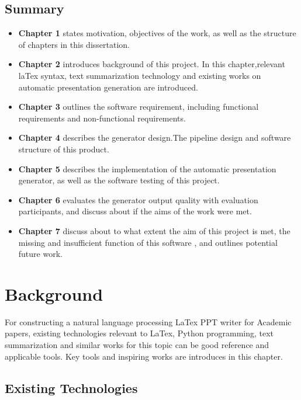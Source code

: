 \documentclass{l4proj}
\begin{document}
\section{Summary}
\begin{itemize}
      \item
    \textbf{Chapter 1} states motivation, objectives of the work, as well as the structure of chapters in this dissertation.
      \item
    \textbf{Chapter 2} introduces background of this project. In this chapter,relevant laTex syntax, text summarization technology and existing works on automatic presentation generation are introduced.
      \item
    \textbf{Chapter 3} outlines the software requirement, including functional requirements and non-functional requirements.
      \item
    \textbf{Chapter 4} describes the generator design.The pipeline design and software structure of this product.
      \item
    \textbf{Chapter 5} describes the implementation of the automatic presentation generator, as well as the software testing of this project.
      \item
    \textbf{Chapter 6} evaluates the generator output quality with evaluation participants, and discuss about if the aims of the work were met.
      \item
    \textbf{Chapter 7} discuss about to what extent the aim of this project is met, the missing and insufficient function of this software , and outlines potential future work.
\end{itemize}

\chapter{Background}
For constructing a natural language processing LaTex PPT writer for Academic papers, existing technologies relevant to LaTex, Python programming, text summarization and similar works for this topic can be good reference and applicable tools. Key tools and inspiring works are introduces in this chapter.
\section{Existing Technologies}
\end{document}
